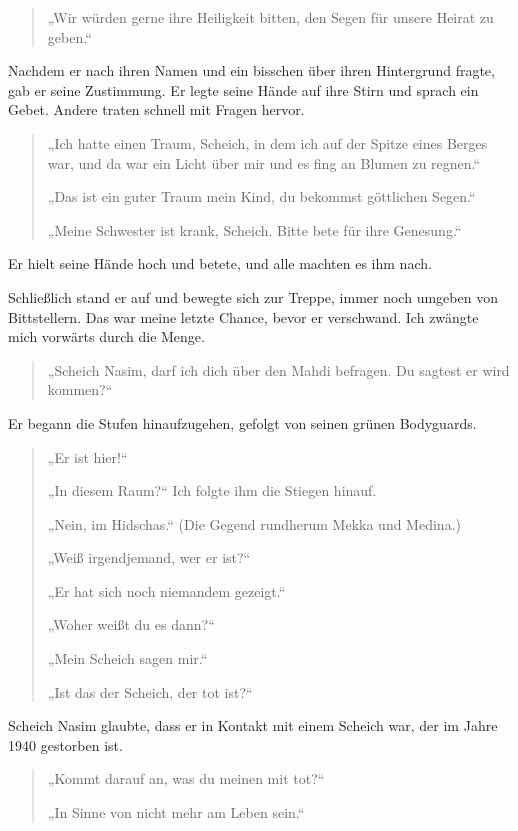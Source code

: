 \documentclass[12pt]{memoir}
\begin{document}
\begin{quote}
„Wir würden gerne ihre Heiligkeit bitten,
den Segen für unsere Heirat zu geben.“
\end{quote}

Nachdem er nach ihren Namen und ein bisschen über ihren Hintergrund fragte,
gab er seine Zustimmung.
Er legte seine Hände auf ihre Stirn und sprach ein Gebet.
Andere traten schnell mit Fragen hervor.

\begin{quote}
„Ich hatte einen Traum, Scheich, in dem ich auf der Spitze eines Berges war,
und da war ein Licht über mir und es fing an Blumen zu regnen.“

„Das ist ein guter Traum mein Kind, du bekommst göttlichen Segen.“

„Meine Schwester ist krank, Scheich. Bitte bete für ihre Genesung.“
\end{quote}

Er hielt seine Hände hoch und betete, und alle machten es ihm nach.

Schließlich stand er auf und bewegte sich zur Treppe,
immer noch umgeben von Bittstellern.
Das war meine letzte Chance, bevor er verschwand.
Ich zwängte mich vorwärts durch die Menge.

\begin{quote}
„Scheich Nasim, darf ich dich über den Mahdi befragen.
Du sagtest er wird kommen?“
\end{quote}

Er begann die Stufen hinaufzugehen, gefolgt von seinen grünen Bodyguards.

\begin{quote}
„Er ist hier!“

„In diesem Raum?“ Ich folgte ihm die Stiegen hinauf.

„Nein, im Hidschas.“ (Die Gegend rundherum Mekka und Medina.)

„Weiß irgendjemand, wer er ist?“

„Er hat sich noch niemandem gezeigt.“

„Woher weißt du es dann?“

„Mein Scheich sagen mir.“

„Ist das der Scheich, der tot ist?“
\end{quote}

Scheich Nasim glaubte, dass er in Kontakt mit einem Scheich war,
der im Jahre 1940 gestorben ist.

\begin{quote}
„Kommt darauf an, was du meinen mit tot?“

„In Sinne von nicht mehr am Leben sein.“
\end{quote}
\end{document}

